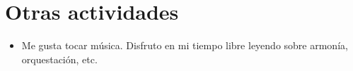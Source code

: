 \documentclass[11pt,a4paper,sans]{moderncv}        %
\begin{document}
\section{Otras actividades}

\vspace{6pt}

\begin{itemize}

\item{Me gusta tocar música. Disfruto en mi tiempo libre leyendo sobre armonía, orquestación, etc.}

\end{itemize}






\nocite{*}



\end{document}

